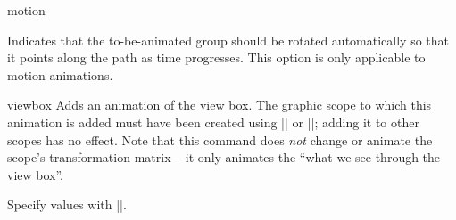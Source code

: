 \begin{sysanimateattribute}{motion}
    \begin{command}{\pgfsysanimkeyrotatealong}
    \end{command}
    \begin{command}{\pgfsys@animation@rotatealong}
        Indicates that the to-be-animated group should be rotated automatically
        so that it points along the path as time progresses. This option is
        only applicable to motion animations.
\begin{codeexample}[imagesource={standalone/pgfmanual-en-pgfsys-animations-animation-24.svg}]
\end{codeexample}
    \end{command}
\end{sysanimateattribute}

\begin{sysanimateattribute}{viewbox}
    Adds an animation of the view box. The graphic scope to which this
    animation is added must have been created using |\pgfsys@viewboxmeet| or
    |\pgfsys@viewboxslice|; adding it to other scopes has no effect. Note that
    this command does \emph{not} change or animate the scope's transformation
    matrix -- it only animates the ``what we see through the view box''.

    Specify values with |\pgfsysanimvalviewbox|.
\begin{codeexample}[imagesource={standalone/pgfmanual-en-pgfsys-animations-animation-25.svg}]
\end{codeexample}
\end{sysanimateattribute}


